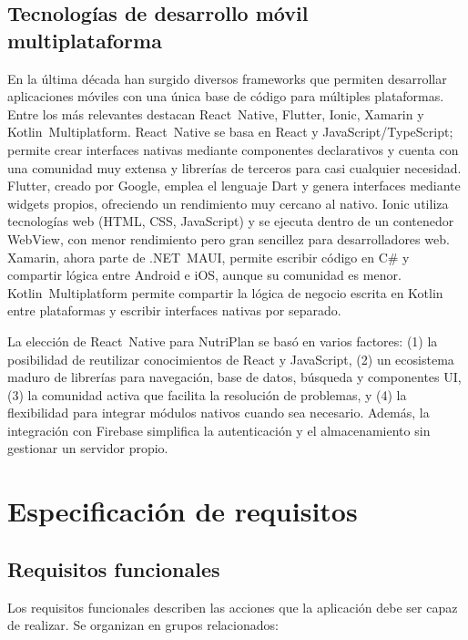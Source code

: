 \documentclass[twoside, openright, 11pt]{report}
\begin{document}
\section{Tecnologías de desarrollo móvil multiplataforma}
\label{sec.tecnologias}
En la última década han surgido diversos frameworks que permiten desarrollar aplicaciones móviles con una única base de código para múltiples plataformas. Entre los más relevantes destacan React Native, Flutter, Ionic, Xamarin y Kotlin Multiplatform. React Native se basa en React y JavaScript/TypeScript; permite crear interfaces nativas mediante componentes declarativos y cuenta con una comunidad muy extensa y librerías de terceros para casi cualquier necesidad. Flutter, creado por Google, emplea el lenguaje Dart y genera interfaces mediante widgets propios, ofreciendo un rendimiento muy cercano al nativo. Ionic utiliza tecnologías web (HTML, CSS, JavaScript) y se ejecuta dentro de un contenedor WebView, con menor rendimiento pero gran sencillez para desarrolladores web. Xamarin, ahora parte de .NET MAUI, permite escribir código en C\# y compartir lógica entre Android e iOS, aunque su comunidad es menor. Kotlin Multiplatform permite compartir la lógica de negocio escrita en Kotlin entre plataformas y escribir interfaces nativas por separado.

La elección de React Native para NutriPlan se basó en varios factores: (1) la posibilidad de reutilizar conocimientos de React y JavaScript, (2) un ecosistema maduro de librerías para navegación, base de datos, búsqueda y componentes UI, (3) la comunidad activa que facilita la resolución de problemas, y (4) la flexibilidad para integrar módulos nativos cuando sea necesario. Además, la integración con Firebase simplifica la autenticación y el almacenamiento sin gestionar un servidor propio.

\chapter{Especificación de requisitos}
\label{cap.requisitos}

\section{Requisitos funcionales}
\label{sec.requisitosfuncionales}
Los requisitos funcionales describen las acciones que la aplicación debe ser capaz de realizar. Se organizan en grupos relacionados:
\end{document}
